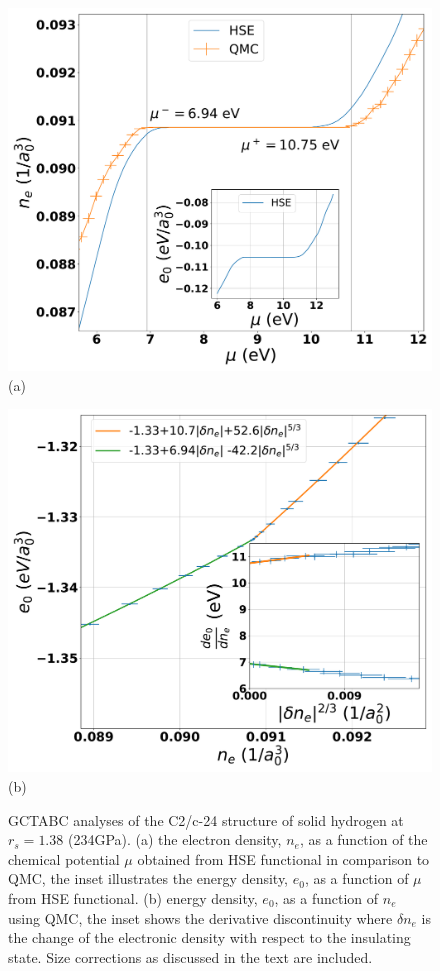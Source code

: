 \begin{figure}
\begin{minipage}[b]{\columnwidth}
\includegraphics[width=\columnwidth]{DFT_RQMC_C2CP250dVs}
(a) 
\end{minipage}
\begin{minipage}[b]{\columnwidth}
\includegraphics[width=\columnwidth]{RQMC_C2CP250dVs}
(b) 
\end{minipage}
\caption{GCTABC analyses of the C2/c-24 structure of solid hydrogen at $r_s=1.38$ (234GPa). (a) 
the electron density, $n_e$, as a function of the chemical potential $\mu$ obtained from HSE functional
in comparison to QMC, the inset illustrates the energy density, $e_0$, as a function of $\mu$ from HSE functional.
(b) energy density, $e_0$, as a function of $n_e$ using QMC, the inset shows the derivative discontinuity where $\delta n_e$ is the change of the electronic density with respect to the insulating state.
Size corrections as discussed in the text are included.
 \label{fig:H_C2CP250}}
\end{figure}

